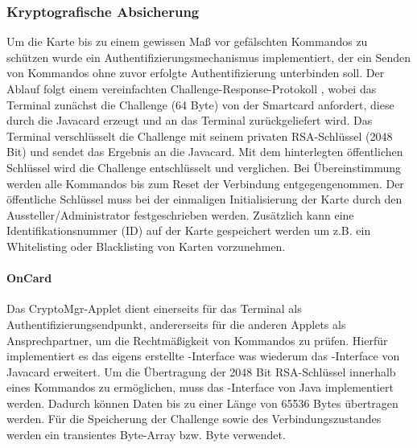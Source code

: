 \documentclass[	a4paper,
			11pt,
			oneside,
			parskip]{scrartcl}
\begin{document}
\subsubsection{Kryptografische Absicherung}
Um die Karte bis zu einem gewissen Maß vor gefälschten Kommandos zu schützen wurde ein Authentifizierungsmechanismus implementiert, der ein Senden von Kommandos ohne zuvor erfolgte Authentifizierung unterbinden soll.
Der Ablauf folgt einem vereinfachten Challenge-Response-Protokoll \cite{Eckert.2013}, wobei das Terminal zunächst die Challenge (64 Byte) von der Smartcard anfordert, diese durch die Javacard erzeugt und an das Terminal
zurückgeliefert wird. Das Terminal verschlüsselt die Challenge mit seinem privaten RSA-Schlüssel (2048 Bit) und sendet das Ergebnis an die Javacard. Mit dem hinterlegten öffentlichen Schlüssel wird die Challenge entschlüsselt und verglichen. Bei Übereinstimmung werden alle Kommandos bis zum Reset der Verbindung entgegengenommen. Der öffentliche Schlüssel muss bei der einmaligen Initialisierung der Karte durch den Aussteller/Administrator festgeschrieben werden. Zusätzlich kann eine Identifikationsnummer (ID) auf der Karte gespeichert werden um z.B. ein Whitelisting oder Blacklisting von Karten vorzunehmen. 

\paragraph{OnCard}
Das CryptoMgr-Applet dient einerseits für das Terminal als Authentifizierungsendpunkt, andererseits für die anderen Applets als Ansprechpartner, um die Rechtmäßigkeit von Kommandos zu prüfen. Hierfür implementiert es das
eigens erstellte -Interface was wiederum das -Interface von Javacard erweitert. Um die Übertragung der 2048 Bit RSA-Schlüssel innerhalb eines Kommandos zu ermöglichen, muss das -Interface von Java implementiert werden. Dadurch können Daten bis zu einer Länge von 65536 Bytes übertragen werden. Für die Speicherung der Challenge sowie des Verbindungszustandes werden ein transientes Byte-Array bzw. Byte verwendet.
\end{document}
